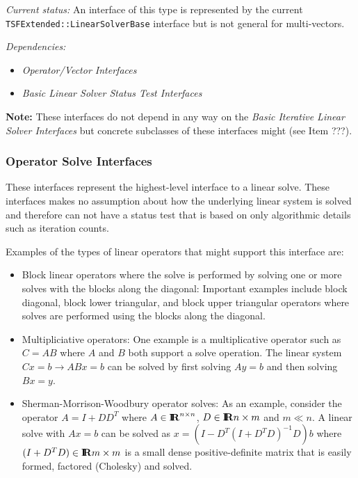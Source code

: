 \documentclass[pdf,ps2pdf,11pt]{SANDreport}
\begin{document}
{}\textit{Current status:} An interface of this type is represented by the
current {}\texttt{TSFExtended\-::Linear\-Solver\-Base} interface but is not
general for multi-vectors.

{}\textit{Dependencies:}
\begin{itemize}
\item {}\textit{Operator/Vector Interfaces}
\item {}\textit{Basic Linear Solver Status Test Interfaces}
\end{itemize}

{}\textbf{Note:} These interfaces do not depend in any way on the
{}\textit{Basic Iterative Linear Solver Interfaces} but concrete subclasses of
these interfaces might (see Item ???).

%
\subsubsection{Operator Solve Interfaces}
%

These interfaces represent the highest-level interface to a linear solve.
These interfaces makes no assumption about how the underlying linear system is
solved and therefore can not have a status test that is based on only
algorithmic details such as iteration counts.

Examples of the types of linear operators that might support this interface
are:
%
\begin{itemize}
%
{}\item Block linear operators where the solve is performed by solving one or
more solves with the blocks along the diagonal:  Important examples include
block diagonal, block lower triangular, and block upper triangular operators
where solves are performed using the blocks along the diagonal.
%
{}\item Multipliciative operators: One example is a multiplicative operator
such as $C = A B$ where $A$ and $B$ both support a solve operation.  The
linear system $C x = b {}\rightarrow A B x = b$ can be solved by first solving
$A y = b$ and then solving $B x = y$.
%
{}\item Sherman-Morrison-Woodbury operator solves: As an example, consider the
operator $A = I + D D^T$ where $A\in\mbox{\textbf{I}}\hspace{-0.6ex}\mbox{\textbf{R}}^{n {}\times n}$, $D\in\mbox{\textbf{I}}\hspace{-0.6ex}\mbox{\textbf{R}}{n {}\times
m}$ and $m {}\ll n$.  A linear solve with $A x = b$ can be solved as $x = (I -
D^T (I + D^T D)^{-1} D) b$ where $(I + D^T D)\in\mbox{\textbf{I}}\hspace{-0.6ex}\mbox{\textbf{R}}{m {}\times m}$ is a small
dense positive-definite matrix that is easily formed, factored (Cholesky) and
solved.
%
\end{itemize}
\end{document}
